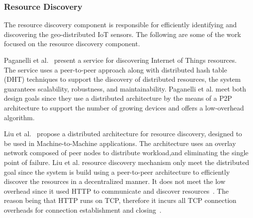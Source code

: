 


\subsubsection{Resource Discovery}
The resource discovery component is responsible for efficiently identifying and discovering the geo-distributed IoT sensors. The following are some of the work focused on the resource discovery component. 

Paganelli et al.~\cite{article} present a service for discovering Internet of Things resources. The service uses a peer-to-peer approach along with distributed hash table (DHT) techniques  to support the discovery of distributed resources, the system guarantees scalability, robustness, and maintainability. Paganelli et al. meet both design goals since they use a distributed architecture by the means of a P2P architecture to support the number of growing devices and offers a low-overhead algorithm.

Liu et al.~\cite{6680268} propose a distributed architecture for resource discovery, designed to be used in Machine-to-Machine applications.
The architecture uses an overlay network composed of peer nodes to distribute workload,and eliminating the single point of failure. Liu et al. resource discovery mechanism only meet the distributed goal since the system is build using a peer-to-peer architecture to efficiently discover the resources in a decentralized manner. It does not meet the low overhead since it used HTTP to communicate and discover resources~\cite{8088251}. The reason being that HTTP runs on TCP, therefore it incurs all TCP connection overheads for connection establishment and closing~\cite{8088251}.



